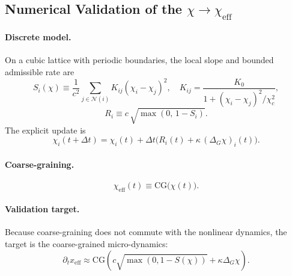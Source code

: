 \subsection{Numerical Validation of the \texorpdfstring{$\chi \to \chi_{\mathrm{eff}}$}{chi to chi_eff}}
  \label{subsec:chi_eff-validation}

  \paragraph{Discrete model.}
    On a cubic lattice with periodic boundaries, the local slope and bounded admissible rate are
    \begin{equation}
      S_i(\chi)
      \equiv
      \frac{1}{c^2}
      \sum_{j\in\mathcal{N}(i)}
      K_{ij}(\chi_i - \chi_j)^2,
      \quad
      K_{ij}
      = \frac{K_0}
      {1 + (\chi_i - \chi_j)^2/\chi_c^2},
      \label{eq:D4_Si_Kij}
    \end{equation}
    \begin{equation}
      R_i \equiv c\,\sqrt{\max(0,\,1-S_i)}.
      \label{eq:D4_Ri_def}
    \end{equation}
    The explicit update is
    \begin{equation}
      \chi_i(t+\Delta t)
      = \chi_i(t)
      + \Delta t\bigl(
      R_i(t) + \kappa\,(\Delta_G\chi)_i(t)
      \bigr).
      \label{eq:D4_update}
    \end{equation}

  \paragraph{Coarse-graining.}
    \begin{equation}
      \chi_{\mathrm{eff}}(t)
      \equiv \mathrm{CG}\bigl(\chi(t)\bigr).
      \label{eq:D4_chi_eff_def}
    \end{equation}

  \paragraph{Validation target.}
    Because coarse-graining does not commute with the nonlinear dynamics,
    the target is the coarse-grained micro-dynamics:
    \begin{equation}
      \partial_t x_{\mathrm{eff}}
      \approx
      \mathrm{CG} \! \left(
                       c \sqrt{\max(0, 1 - S(\chi))}
                       + \kappa \Delta_G \chi
      \right).
      \label{eq:D4_target_cg_dynamics}
    \end{equation}


